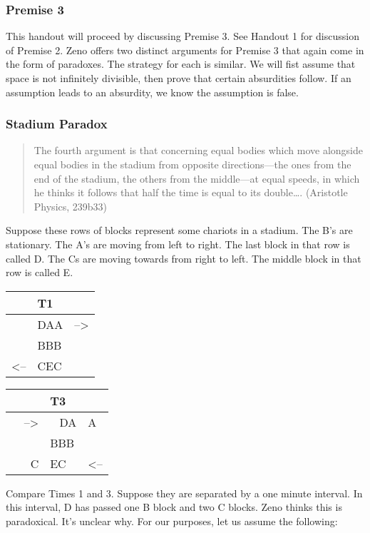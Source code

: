 \documentclass[]{article}
\begin{document}
\subsubsection{Premise 3}\label{premise-3}

This handout will proceed by discussing Premise 3. See Handout 1 for
discussion of Premise 2. Zeno offers two distinct arguments for Premise
3 that again come in the form of paradoxes. The strategy for each is
similar. We will fist assume that space is not infinitely divisible,
then prove that certain absurdities follow. If an assumption leads to an
absurdity, we know the assumption is false.

\subsubsection{Stadium Paradox}\label{stadium-paradox}

\begin{quote}
The fourth argument is that concerning equal bodies which move alongside
equal bodies in the stadium from opposite directions---the ones from the
end of the stadium, the others from the middle---at equal speeds, in
which he thinks it follows that half the time is equal to its
double\ldots{}. (Aristotle Physics, 239b33)
\end{quote}

Suppose these rows of blocks represent some chariots in a stadium. The
B's are stationary. The A's are moving from left to right. The last
block in that row is called D. The Cs are moving towards from right to
left. The middle block in that row is called E. 

\begin{longtable}[c]{@{}lll@{}}
\toprule
& T1 &\tabularnewline
\midrule
\endhead
& DAA & --\textgreater{}\tabularnewline
& BBB &\tabularnewline
\textless{}-- & CEC &\tabularnewline
\bottomrule
\end{longtable}

\begin{longtable}[c]{@{}rll@{}}
\toprule
& T3 &\tabularnewline
\midrule
\endhead
--\textgreater{} & ~ DA & A\tabularnewline
& BBB &\tabularnewline
~ ~ C & EC~ & \textless{}--\tabularnewline
\bottomrule
\end{longtable}

Compare Times 1 and 3. Suppose they are separated by a one minute
interval. In this interval, D has passed one B block and two C blocks.
Zeno thinks this is paradoxical. It's unclear why. For our purposes, let
us assume the following:
\end{document}
